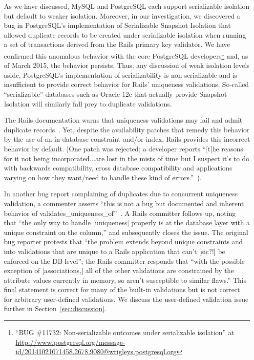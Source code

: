 As we have discussed, MySQL and PostgreSQL each support serializable
isolation but default to weaker isolation. Moreover, in our
investigation, we discovered a bug in PostgreSQL's implementation of
Serializable Snapshot Isolation that allowed duplicate records to be
created under serializable isolation when running a set of
transactions derived from the Rails primary key validator. We have
confirmed this anomalous behavior with the core PostgreSQL
developers\footnote{``BUG \#11732: Non-serializable outcomes under
  serializable isolation'' at
  \url{http://www.postgresql.org/message-id/20141021071458.2678.9080@wrigleys.postgresql.org}\label{fn:pg-bug}}
and, as of March 2015, the behavior persists. Thus, any discussion of
weak isolation levels aside, PostgreSQL's implementation of
serializability is non-serializable and is insufficient to provide
correct behavior for Rails' uniqueness validations. So-called
``serializable'' databases such as Oracle 12c that actually provide
Snapshot Isolation will similarly fall prey to duplicate validations.

The Rails documentation warns that uniqueness validations may fail and
admit duplicate records~\cite{rails-guide}. Yet, despite the
availability patches that remedy this behavior by the use of an
in-database constraint and/or index, Rails provides this incorrect
behavior by default. (One patch was rejected; a developer reports
``[t]he reasons for it not being incorporated...are lost in the mists
of time but I suspect it's to do with backwards compatibility, cross
database compatibility and applications varying on how they want/need
to handle these kind of errors.''~\cite{code-index-patch}).

In another bug report complaining of duplicates due to concurrent
uniqueness validation, a commenter asserts ``this is not a bug but
documented and inherent behavior of
validates\_uniqueness\_of''~\cite{code-index-error}.  A Rails
committer follows up, noting that ``the only way to handle
[uniqueness] properly is at the database layer with a unique
constraint on the column,'' and subsequently closes the issue. The
original bug reporter protests that ``the problem extends beyond
unique constraints and into validations that are unique to a Rails
application that can't [sic?!]  be enforced on the DB level''; the
Rails committer responds that ``with the possible exception of
[associations,] all of the other validations are constrained by the
attribute values currently in memory, so aren't susceptible to similar
flaws.'' This final statement is correct for many of the built-in
validations but is not correct for arbitrary user-defined
validations. We discuss the user-defined validation issue further in
Section~\ref{sec:discussion}.

